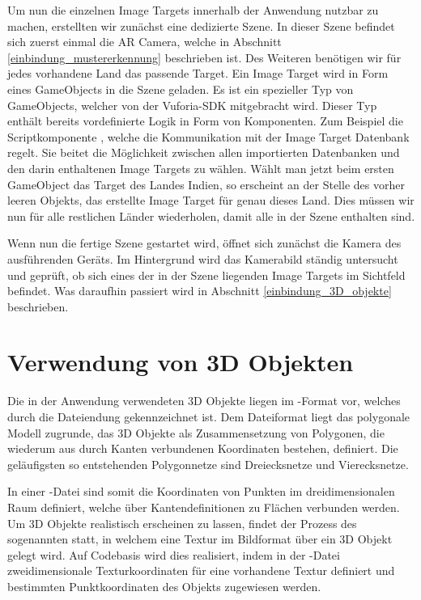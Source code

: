 Um nun die einzelnen Image Targets innerhalb der Anwendung nutzbar zu machen, erstellten wir zunächst eine dedizierte Szene. 
In dieser Szene befindet sich zuerst einmal die AR Camera, welche in Abschnitt \ref{einbindung_mustererkennung} beschrieben ist. 
Des Weiteren benötigen wir für jedes vorhandene Land das passende Target.
Ein Image Target wird in Form eines GameObjects in die Szene geladen.
Es ist ein spezieller Typ von GameObjects, welcher von der Vuforia-SDK mitgebracht wird.
Dieser Typ enthält bereits vordefinierte Logik in Form von Komponenten. 
Zum Beispiel die Scriptkomponente , welche die Kommunikation mit der Image Target Datenbank regelt. 
Sie beitet die Möglichkeit zwischen allen importierten Datenbanken und den darin enthaltenen Image Targets zu wählen.
Wählt man jetzt beim ersten GameObject das Target des Landes Indien, so erscheint an der Stelle des vorher leeren Objekts, das erstellte Image Target für genau dieses Land.
Dies müssen wir nun für alle restlichen Länder wiederholen, damit alle in der Szene enthalten sind.

Wenn nun die fertige Szene gestartet wird, öffnet sich zunächst die Kamera des ausführenden Geräts.
Im Hintergrund wird das Kamerabild ständig untersucht und geprüft, ob sich eines der in der Szene liegenden Image Targets im Sichtfeld befindet. Was daraufhin passiert wird in Abschnitt \ref{einbindung_3D_objekte} beschrieben.

\section{Verwendung von 3D Objekten}\label{verwendung_3d_objekte}
Die in der Anwendung verwendeten 3D Objekte liegen im -Format vor, welches durch die Dateiendung  gekennzeichnet ist. 
Dem Dateiformat liegt das polygonale Modell zugrunde, das 3D Objekte als Zusammensetzung von Polygonen, die wiederum aus durch Kanten verbundenen Koordinaten bestehen, definiert. 
Die geläufigsten so entstehenden Polygonnetze sind Dreiecksnetze und Vierecksnetze.

In einer  -Datei sind somit die Koordinaten von Punkten im dreidimensionalen Raum definiert, welche über Kantendefinitionen zu Flächen verbunden werden. 
Um 3D Objekte realistisch erscheinen zu lassen, findet der Prozess des sogenannten  statt, in welchem eine Textur im Bildformat über ein 3D Objekt gelegt wird. 
Auf Codebasis wird dies realisiert, indem in der -Datei zweidimensionale Texturkoordinaten für eine vorhandene Textur definiert und bestimmten Punktkoordinaten des Objekts zugewiesen werden.

